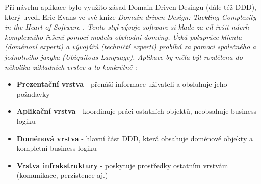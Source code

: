Při návrhu aplikace bylo využito zásad Domain Driven Desingu (dále též DDD), který uvedl Eric Evans ve své knize \it{Domain-driven Design: Tackling Complexity in the Heart of Software} \cite{EvansDDD}. Tento styl vývoje software si klade za cíl řešit návrh komplexního řešení pomocí modelu obchodní domény. Úzká polupráce klienta (doménoví experti) a vývojářů (techničtí experti) probíhá za pomoci společného a jednotného jazyka (\it{Ubiquitous Language}). Aplikace by měla být rozdělena do několika základních vrstev a to konkrétně \cite{EvansDDD}:

\begin{itemize}
	\item \textbf{Prezentační vrstva} - přenáší informace uživateli a obsluhuje jeho požadavky
	\item \textbf{Aplikační vrstva} - koordinuje práci ostatních objektů, neobsahuje business logiku
	\item \textbf{Doménová vrstva} - hlavní část DDD, která obsahuje doménové objekty a kompletní business logiku
	\item \textbf{Vrstva infrakstruktury} - poskytuje prostředky ostatním vrstvám (komunikace, perzistence aj.)
\end{itemize}


